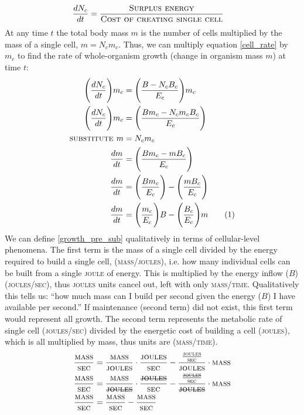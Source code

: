 \documentclass[a4paper]{article} %
\newcommand\numberthis{\addtocounter{equation}{1}\tag{\theequation}}
\begin{document}
\begin{align*}    
    \frac{dN_{c}}{dt} &= \frac{\textsc{Surplus energy}}{\textsc{Cost of creating single cell}}
\end{align*}
At any time $t$ the total body mass $m$ is the number of cells multiplied by the mass of a single cell, $m = N_{c}m_{c}$. Thus, we can multiply equation \eqref{cell_rate} by $m_{c}$ to find the rate of whole-organism growth (change in organism mass $m$) at time $t$:
\begin{align*}
    \Bigg(\frac{dN_{c}}{dt}\Bigg)m_c &= \Bigg(\frac{B - N_{c}B_{c}}{E_{c}}\Bigg)m_c \\
    \Bigg(\frac{dN_{c}}{dt}\Bigg)m_c &= \Bigg(\frac{Bm_c - N_{c}m_{c}B_{c}}{E_c}\Bigg) \\
    \textsc{substitute } m &= N_{c}m_{c} \\
    \frac{dm}{dt} &= \Bigg(\frac{Bm_c - mB_{c}}{E_c}\Bigg) \\
    \frac{dm}{dt} &= \Bigg(\frac{Bm_c}{E_c}\Bigg) - \Bigg(\frac{mB_{c}}{E_c}\Bigg) \\
    \frac{dm}{dt} &= \Bigg(\frac{m_c}{E_c}\Bigg)B - \Bigg(\frac{B_{c}}{E_c}\Bigg)m \numberthis \label{growth_pre_sub}
\end{align*}
We can define \eqref{growth_pre_sub} qualitatively in terms of cellular-level phenomena. The first term is the mass of a single cell divided by the energy required to build a single cell, (\textsc{mass/joules}), i.e. how many individual cells can be built from a single \textsc{joule} of energy. This is multiplied by the energy inflow ($B$) (\textsc{joules/sec}), thus \textsc{joules} units cancel out, left with only \textsc{mass/time}. Qualitatively this tells us: ``how much mass can I build per second given the energy ($B$) I have available per second.'' If maintenance (second term) did not exist, this first term would represent all growth. The second term represents the metabolic rate of single cell (\textsc{joules/sec}) divided by the energetic cost of building a cell (\textsc{joules}), which is all multiplied by mass, thus units are (\textsc{mass/time}).
\begin{align*}
    \frac{\textsc{mass}}{\textsc{sec}} &= \frac{\textsc{mass}}{\textsc{joules}}\cdot\frac{\textsc{joules}}{\textsc{sec}} - \frac{\frac{\textsc{joules}}{\textsc{sec}}}{\textsc{joules}}\cdot\textsc{mass} \\
    \frac{\textsc{mass}}{\textsc{sec}} &= \frac{\textsc{mass}}{\textsc{\st{joules}}}\cdot\frac{\textsc{\st{joules}}}{\textsc{sec}} - \frac{\frac{\textsc{\st{joules}}}{\textsc{sec}}}{\textsc{\st{joules}}}\cdot\textsc{mass} \\
    \frac{\textsc{mass}}{\textsc{sec}} &= \frac{\textsc{mass}}{\textsc{sec}} - \frac{\textsc{mass}}{\textsc{sec}} \\
\end{align*}
\end{document}
